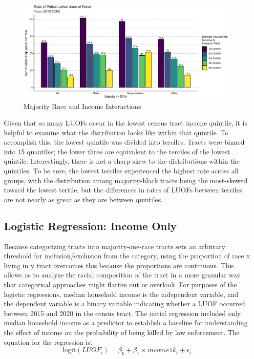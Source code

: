 \documentclass[12pt]{article}
\begin{document}
\begin{figure}[H]
  \centering %
  \includegraphics[width=\linewidth]{images/race_only_denom_race}
  \captionsetup{justification=centering, singlelinecheck=false, margin=2cm}
  \caption[Majority Race and Income Interactions]{Majority Race and Income Interactions}
  \label{fig:majority_income_interactions}
\end{figure}

Given that so many LUOFs occur in the lowest census tract income quintile, it is helpful to examine what the distribution looks like within that quintile. To accomplish this, the lowest quintile was divided into terciles. Tracts were binned into 15 quantiles; the lower three are equivalent to the terciles of the lowest quintile. Interestingly, there is not a sharp skew to the distributions within the quintiles. To be sure, the lowest terciles experienced the highest rate across all groups, with the distribution among majority-black tracts being the most-skewed toward the lowest tertile, but the differences in rates of LUOFs between terciles are not nearly as great as they are between quintiles.

\subsection{Logistic Regression: Income Only}

Because categorizing tracts into majority-one-race tracts sets an arbitrary threshold for inclusion/exclusion from the category, using the proportion of race x living in y tract overcomes this because the proportions are continuous. This allows us to analyze the racial composition of the tract in a more granular way that categorical approaches might flatten out or overlook. For purposes of the logistic regressions, median household income is the independent variable, and the dependent variable is a binary variable indicating whether a LUOF occurred between 2015 and 2020 in the census tract. The initial regression included only median household income as a predictor to establish a baseline for understanding the effect of income on the probability of being killed by law enforcement. The equation for the regression is:
\begin{equation}
\text{logit}(LUOF_{i})=\beta_{0} + \beta_{1} \times income1k_{i} + \epsilon_{i}
\end{equation}
\end{document}
